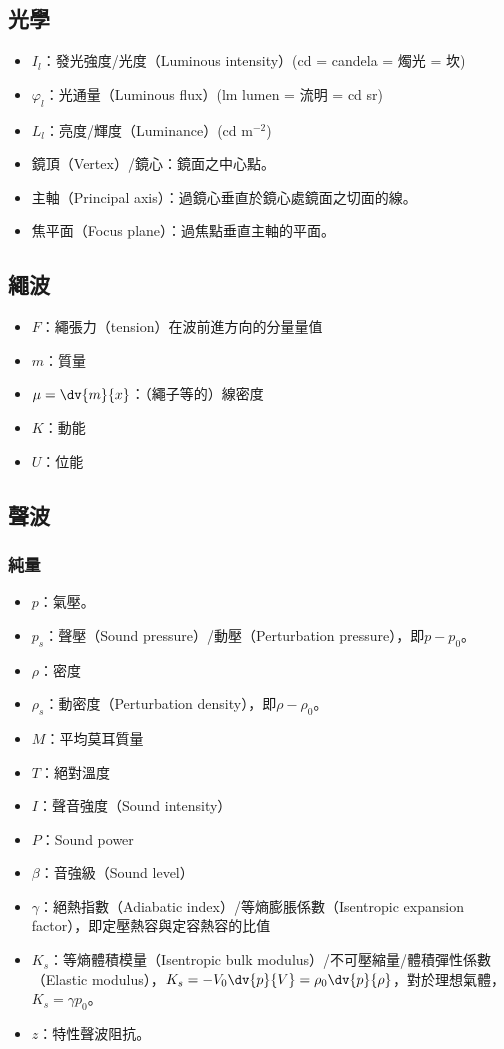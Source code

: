 \documentclass[a4paper,12pt]{report}
\begin{document}
\subsection{光學}
\begin{itemize}
\item $I_l$：發光強度/光度（Luminous intensity）(cd = candela = 燭光 = 坎)
\item $\varphi_l$：光通量（Luminous flux）(lm lumen = 流明 = cd sr)
\item $L_l$：亮度/輝度（Luminance）(cd m$^{-2}$)
\end{itemize}
\begin{itemize}
\item 鏡頂（Vertex）/鏡心：鏡面之中心點。
\item 主軸（Principal axis）：過鏡心垂直於鏡心處鏡面之切面的線。
\item 焦平面（Focus plane）：過焦點垂直主軸的平面。
\end{itemize}
\subsection{繩波}
\begin{itemize}
\item $F$：繩張力（tension）在波前進方向的分量量值
\item $m$：質量
\item $\mu=\dv{m}{x}$：（繩子等的）線密度
\item $K$：動能
\item $U$：位能
\end{itemize}
\subsection{聲波}
\subsubsection{純量}
\begin{itemize}
\item $p$：氣壓。
\item $p_s$：聲壓（Sound pressure）/動壓（Perturbation pressure），即$p-p_0$。
\item $\rho$：密度
\item $\rho_s$：動密度（Perturbation density），即$\rho-\rho_0$。
\item $M$：平均莫耳質量
\item $T$：絕對溫度
\item $I$：聲音強度（Sound intensity）
\item $P$：Sound power
\item $\beta $：音強級（Sound level）
\item $\gamma$：絕熱指數（Adiabatic index）/等熵膨脹係數（Isentropic expansion factor），即定壓熱容與定容熱容的比值
\item $K_s$：等熵體積模量（Isentropic bulk modulus）/不可壓縮量/體積彈性係數（Elastic modulus），$K_s=-V_0\dv{p}{V}=\rho_0\dv{p}{\rho}$，對於理想氣體，$K_s=\gamma p_0$。
\item $z$：特性聲波阻抗。
\end{itemize}
\end{document}
